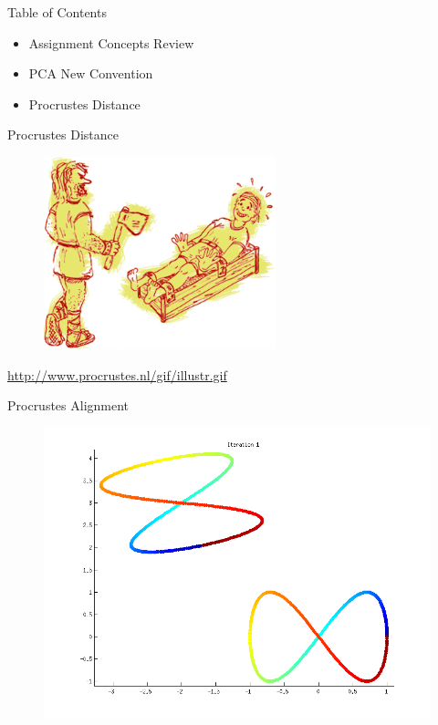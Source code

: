 \documentclass{beamer}
\begin{document}
\begin{frame}{Table of Contents}
\begin{itemize}[label=$\vartriangleright$]
	\item Assignment Concepts Review
\end{itemize}
\begin{itemize}[label=$\vartriangleright$]
	\item PCA New Convention
\end{itemize}
\begin{itemize}[label=$\blacktriangleright$]
	\item Procrustes Distance
\end{itemize}

\end{frame}


\begin{frame}{Procrustes Distance}

\begin{figure}[t]
	\centering
    \includegraphics[width=0.6\textwidth]{procrustes.png}
\end{figure}

\url{http://www.procrustes.nl/gif/illustr.gif}

\end{frame}

\begin{frame}{Procrustes Alignment}

\begin{figure}[t]
	\centering
    \includegraphics[width=\textwidth]{ProcrustesEx1.png}
\end{figure}

\end{frame}
\end{document}
